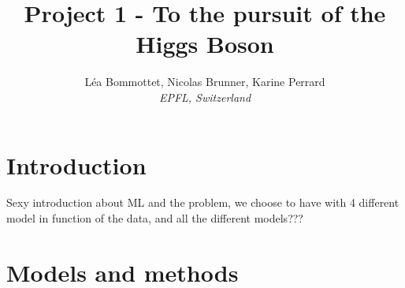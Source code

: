 \documentclass[10pt,conference,compsocconf]{IEEEtran}
\begin{document}
\title{Project 1 - To the pursuit of the Higgs Boson}

\author{
  L\'ea Bommottet, Nicolas Brunner, Karine Perrard\\
  \textit{ EPFL, Switzerland}
}

\maketitle

\section{Introduction}

Sexy introduction about ML and the problem,
we choose to have  with 4 different model in function of the data, and all the different models???  


\section{Models and methods}
\end{document}
